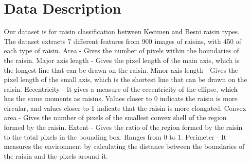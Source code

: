 \documentclass{article}
\begin{document}
\section{Data Description}
Our dataset is for raisin classification between Kecimen and Besni raisin types.  The dataset extracts 7 different features from 900 images of raisins, with 450 of each type of raisin.
Area - Gives the number of pixels within the boundaries of the raisin.
Major axis length - Gives the pixel length of the main axis, which is the longest line that can be drawn on the raisin.
Minor axis length - Gives the pixel length of the small axis, which is the shortest line that can be drawn on the raisin.
Eccentricity - It gives a measure of the eccentricity of the ellipse, which has the same moments as raisins.  Values closer to 0 indicate the raisin is more circular, and values closer to 1 indicate that the raisin is more elongated.
Convex area - Gives the number of pixels of the smallest convex shell of the region formed by the raisin.
Extent - Gives the ratio of the region formed by the raisin to the total pixels in the bounding box.  Ranges from 0 to 1.
Perimeter - It measures the environment by calculating the distance between the boundaries of the raisin and the pixels around it.
\end{document}
